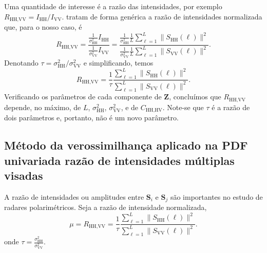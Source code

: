 \documentclass[12pt]{article}
\begin{document}
Uma quantidade de interesse é a razão das intensidades, por exemplo $R_{\text{HH,VV}} = I_{\text{HH}} / I_{\text{VV}}$.
\citet{lee} tratam de forma genérica a razão de intensidades normalizada que, para o nosso caso, é
$$
R_{\text{HH,VV}} = \frac{\frac1{\sigma_{\text{HH}}^2}I_{\text{HH}}}
						{\frac1{\sigma_{\text{VV}}^2}I_{\text{VV}}} = 
	\frac{\frac1{\sigma_{\text{HH}}^2} \frac1L \sum_{\ell=1}^{L}\|S_{\text{HH}}(\ell)\|^2}
	{\frac1{\sigma_{\text{VV}}^2} \frac1L \sum_{\ell=1}^{L}\|S_{\text{VV}}(\ell)\|^2}.
$$
Denotando $\tau = \sigma_{\text{HH}}^2 / \sigma_{\text{VV}}^2$ e simplificando, temos
$$
R_{\text{HH,VV}} = \frac{1}{\tau}
\frac{\sum_{\ell=1}^{L}\|S_{\text{HH}}(\ell)\|^2}
{\sum_{\ell=1}^{L}\|S_{\text{VV}}(\ell)\|^2}.
$$
Verificando os parâmetros de cada componente de $\bm Z$, concluímos que $R_{\text{HH,VV}}$ depende, no máximo, de $L$, $\sigma_{\text{HH}}^2$, $\sigma_{\text{VV}}^2$, e de $C_{\text{HH,HV}}$.
Note-se que $\tau$ é a razão de dois parâmetros e, portanto, não é um novo parâmetro.


\subsection{Método da verossimilhança aplicado na PDF univariada razão de intensidades múltiplas visadas}
A razão de intensidades ou amplitudes entre $\mathbf{S}_i$ e $\mathbf{S}_j$ são importantes no estudo de radares polarimétricos. Seja a razão de intensidade normalizada,
\begin{equation}\label{eq:razao_intensidades}
 \mu=R_{\text{HH,VV}} = \frac{1}{\tau}
\frac{\sum_{\ell=1}^{L}\|S_{\text{HH}}(\ell)\|^2}
{\sum_{\ell=1}^{L}\|S_{\text{VV}}(\ell)\|^2}.
\end{equation}
onde $\tau=\frac{\sigma^2_{\text{HH}}}{\sigma^2_{\text{VV}}}$.
  
\end{document}
